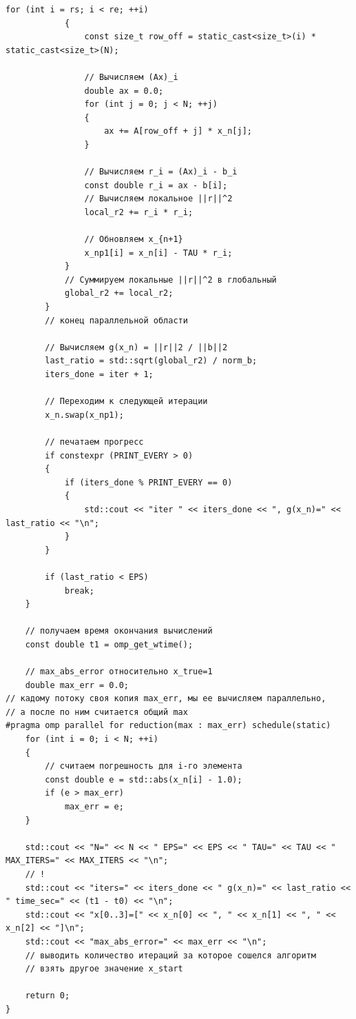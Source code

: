 \documentclass[a4paper, 14pt]{extarticle}
\begin{document}
\begin{lstlisting}[caption={Исходный код программы}, label={lst:source_code}]
            for (int i = rs; i < re; ++i)
            {
                const size_t row_off = static_cast<size_t>(i) * static_cast<size_t>(N);

                // Вычисляем (Ax)_i
                double ax = 0.0;
                for (int j = 0; j < N; ++j)
                {
                    ax += A[row_off + j] * x_n[j];
                }

                // Вычисляем r_i = (Ax)_i - b_i
                const double r_i = ax - b[i];
                // Вычисляем локальное ||r||^2
                local_r2 += r_i * r_i;

                // Обновляем x_{n+1}
                x_np1[i] = x_n[i] - TAU * r_i;
            }
            // Суммируем локальные ||r||^2 в глобальный
            global_r2 += local_r2;
        }
        // конец параллельной области

        // Вычисляем g(x_n) = ||r||2 / ||b||2
        last_ratio = std::sqrt(global_r2) / norm_b;
        iters_done = iter + 1;

        // Переходим к следующей итерации
        x_n.swap(x_np1);

        // печатаем прогресс
        if constexpr (PRINT_EVERY > 0)
        {
            if (iters_done % PRINT_EVERY == 0)
            {
                std::cout << "iter " << iters_done << ", g(x_n)=" << last_ratio << "\n";
            }
        }

        if (last_ratio < EPS)
            break;
    }

    // получаем время окончания вычислений
    const double t1 = omp_get_wtime();

    // max_abs_error относительно x_true=1
    double max_err = 0.0;
// кадому потоку своя копия max_err, мы ее вычисляем параллельно,
// а после по ним считается общий max
#pragma omp parallel for reduction(max : max_err) schedule(static)
    for (int i = 0; i < N; ++i)
    {
        // считаем погрешность для i-го элемента
        const double e = std::abs(x_n[i] - 1.0);
        if (e > max_err)
            max_err = e;
    }

    std::cout << "N=" << N << " EPS=" << EPS << " TAU=" << TAU << " MAX_ITERS=" << MAX_ITERS << "\n";
    // !
    std::cout << "iters=" << iters_done << " g(x_n)=" << last_ratio << " time_sec=" << (t1 - t0) << "\n";
    std::cout << "x[0..3]=[" << x_n[0] << ", " << x_n[1] << ", " << x_n[2] << "]\n";
    std::cout << "max_abs_error=" << max_err << "\n";
    // выводить количество итераций за которое сошелся алгоритм
    // взять другое значение x_start

    return 0;
}
\end{lstlisting}
\end{document}
